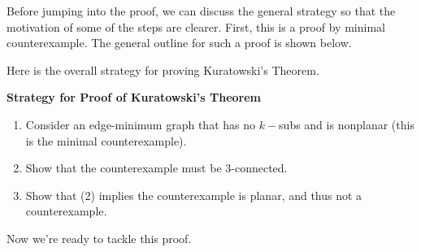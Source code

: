 \documentclass[12pt]{article}
\theoremstyle{definition}
\begin{document}
Before jumping into the proof, we can discuss the general strategy so that the motivation of some of the steps are clearer. First, this is a proof by minimal counterexample. The general outline for such a proof is shown below.

Here is the overall strategy for proving Kuratowski's Theorem.

\textbf{Strategy for Proof of Kuratowski's Theorem}
\begin{enumerate}
    \item Consider an edge-minimum graph that has no $k-$subs and is nonplanar (this is the minimal counterexample).

    \item Show that the counterexample must be 3-connected.

    \item Show that (2) implies the counterexample is planar, and thus not a counterexample.
\end{enumerate}
Now we're ready to tackle this proof.
\end{document}
